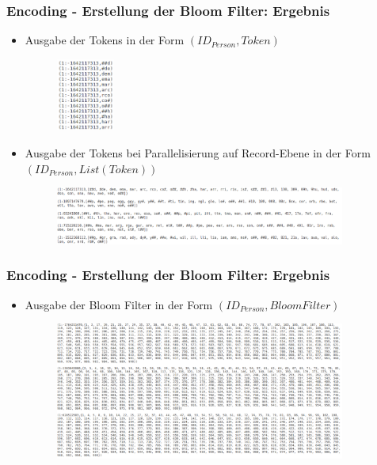 \documentclass{beamer}
\begin{document}
    \begin{frame}
    		\frametitle{Encoding - Erstellung der Bloom Filter: Ergebnis}
    		\begin{itemize}
    			\item Ausgabe der Tokens in der Form $(ID_{Person}, Token)$
    				\begin{figure}[H]
    					\includegraphics[width=0.18\textwidth]{graphics/tokens_1.png}
    				\end{figure}
    			\item Ausgabe der Tokens bei Parallelisierung auf Record-Ebene in der Form
    			$(ID_{Person}, List(Token))$
    				\begin{figure}[H]
    					\includegraphics[width=0.9\textwidth]{graphics/tokens_2.png}
    				\end{figure}
    		\end{itemize}
    \end{frame}
   
    \begin{frame}
    		\frametitle{Encoding - Erstellung der Bloom Filter: Ergebnis}
    		\begin{itemize}
    			\item Ausgabe der Bloom Filter in der Form $(ID_{Person}, BloomFilter)$
    				\begin{figure}[H]
    					\includegraphics[width=0.9\textwidth]{graphics/bloomfilter.png}
    				\end{figure}
    		\end{itemize}
    \end{frame}
\end{document}
